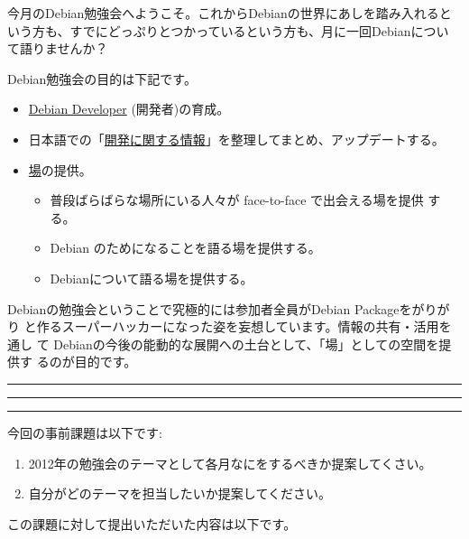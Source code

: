 \documentclass[mingoth,a4paper]{jsarticle}
\begin{document}
\begin{multicols}{2}
 

 今月のDebian勉強会へようこそ。これからDebianの世界にあしを踏み入れると
 いう方も、すでにどっぷりとつかっているという方も、月に一回Debianについ
 て語りませんか？

 Debian勉強会の目的は下記です。

 \begin{itemize}
 \item \underline{Debian Developer} (開発者)の育成。
 \item 日本語での「\underline{開発に関する情報}」を整理してまとめ、アップデートする。
 \item \underline{場}の提供。
 \begin{itemize}
  \item 普段ばらばらな場所にいる人々が face-to-face で出会える場を提供
	する。
  \item Debian のためになることを語る場を提供する。
  \item Debianについて語る場を提供する。
 \end{itemize}
 \end{itemize}		

 Debianの勉強会ということで究極的には参加者全員がDebian Packageをがりがり
 と作るスーパーハッカーになった姿を妄想しています。情報の共有・活用を通し
 て Debianの今後の能動的な展開への土台として、「場」としての空間を提供す
 るのが目的です。

\end{multicols}

\newpage

\begin{minipage}[b]{0.2\hsize}
 \colorbox{titleback}{}
\end{minipage}
\begin{minipage}[b]{0.8\hsize}
\hrule
\vspace{2mm}
\hrule
\begin{multicols}{2}
\tableofcontents
\end{multicols}
\vspace{2mm}
\hrule
\end{minipage}


今回の事前課題は以下です:
\begin{enumerate}
 \item 2012年の勉強会のテーマとして各月なにをするべきか提案してくさい。 
 \item 自分がどのテーマを担当したいか提案してください。
\end{enumerate}
この課題に対して提出いただいた内容は以下です。
\begin{multicols}{2}
{\small
 
}
\end{multicols}
\end{document}
